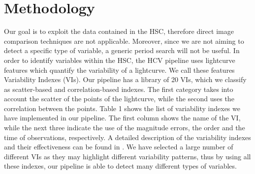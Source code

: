 \documentclass{iau}
\begin{document}
\section{Methodology}
Our goal is to exploit the data contained in the HSC, therefore direct image comparison techniques are not applicable. Moreover, since we are not aiming to detect a specific type of variable, a generic period search will not be useful.
In order to identify variables within the HSC, the HCV pipeline uses lightcurve features which quantify the variability of a lightcurve. We call these features Variability Indexes (VIs). Our pipeline has a library of 20 VIs, which we classify as scatter-based and correlation-based indexes. The first category takes into account the scatter of the points of the lightcurve, while the second uses the correlation between the points. Table 1 shows the list of variability indexes we have implemented in our pipeline. The first column shows the name of the VI, while the next three indicate the use of the magnitude errors, the order  and the time of observations, respectively.
 A detailed description of the variability indexes and their effectiveness can be found in \cite[Sokolovsky et al. (2017)]{Sokolovsky}. We have selected a large number of different VIs as they may highlight different variability patterns, thus by using all these indexes, our pipeline is able to detect many different types of variables.
\end{document}
